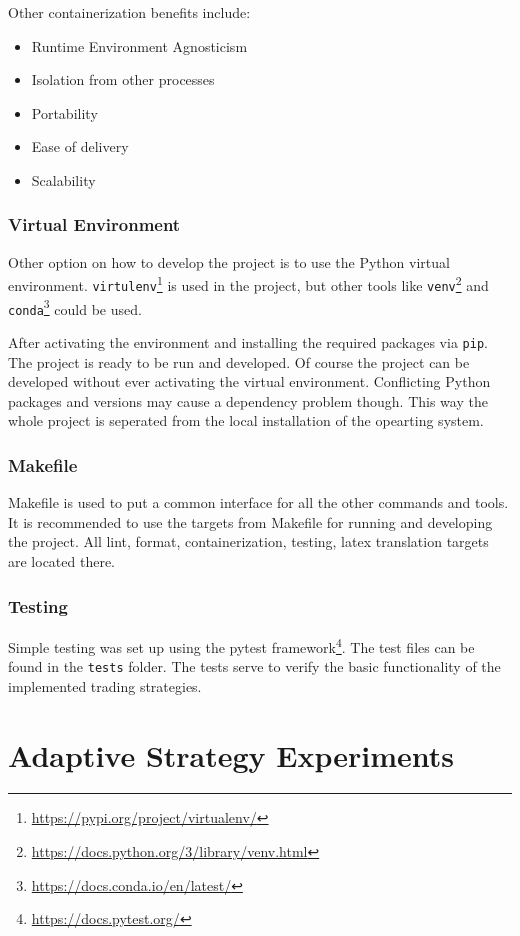 Other containerization benefits include:
\begin{itemize}
    \item Runtime Environment Agnosticism
    \item Isolation from other processes
    \item Portability
    \item Ease of delivery
    \item Scalability
\end{itemize}

\subsection*{Virtual Environment}
Other option on how to develop the project is to use the Python virtual environment. \texttt{virtulenv}\footnote{\url{https://pypi.org/project/virtualenv/}} is used in the project, but other tools like \texttt{venv}\footnote{\url{https://docs.python.org/3/library/venv.html}} and \texttt{conda}\footnote{\url{https://docs.conda.io/en/latest/}} could be used.

After activating the environment and installing the required packages via \texttt{pip}. The project is ready to be run and developed. Of course the project can be developed without ever activating the virtual environment. Conflicting Python packages and versions may cause a dependency problem though. This way the whole project is seperated from the local installation of the opearting system.

\subsection*{Makefile}
Makefile is used to put a common interface for all the other commands and tools. It is recommended to use the targets from Makefile for running and developing the project. All lint, format, containerization, testing, latex translation targets are located there.

\subsection*{Testing}
Simple testing was set up using the pytest framework\footnote{\url{https://docs.pytest.org/}}. The test files can be found in the \texttt{tests} folder. The tests serve to verify the basic functionality of the implemented trading strategies.

\chapter{Adaptive Strategy Experiments}
\label{chapter-experiments}

